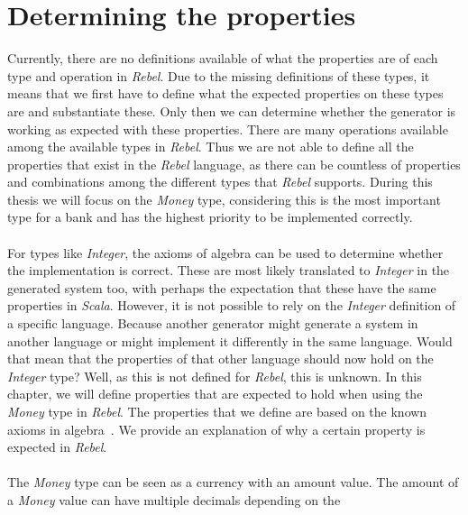 \section{Determining the properties}
Currently, there are no definitions available of what the properties are of
each type and operation in \textit{Rebel}. Due to the missing definitions of
these types, it means that we first have to define what the expected properties
on these types are and substantiate these. Only then we can determine whether
the generator is working as expected with these properties. There are many
operations available among the available types in \textit{Rebel}. Thus we are
not able to define all the properties that exist in the \textit{Rebel} language,
as there can be countless of properties and combinations among the different
types that \textit{Rebel} supports. During this thesis we will focus on the
\textit{Money} type, considering this is the most important type for a bank and
has the highest priority to be implemented correctly.\\
\\
For types like \textit{Integer}, the axioms of algebra can be used to determine whether
the implementation is correct. These are most likely translated to \textit{Integer} in
the generated system too, with perhaps the expectation that these have the same
properties in \textit{Scala}. However, it is not possible to rely on the
\textit{Integer} definition of a specific language. Because another generator
might generate a system in another language or might implement it differently in
the same language. Would that mean that the properties of that other language
should now hold on the \textit{Integer} type? Well, as this is not defined for
\textit{Rebel}, this is unknown. In this chapter, we will define properties that
are expected to hold when using the \textit{Money} type in \textit{Rebel}. The
properties that we define are based on the known axioms in
algebra~\cite{baumgart1961axioms,raftery2011perspective,apostol2007calculus}. We
provide an explanation of why a certain property is expected in
\textit{Rebel}.\\
\\
The \textit{Money} type can be seen as a currency with an amount value. The
amount of a \textit{Money} value can have multiple decimals depending on the

